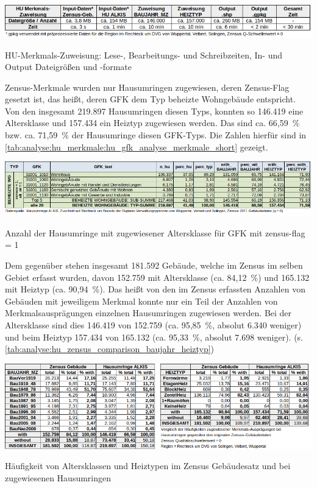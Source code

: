		
		\begin{table}[h]
			\centering
			\includegraphics[width=\linewidth]{Medien/tables/read_write_stats/HU_ALKIS_merkmale_read_write_stats_short.png}
			\caption{HU-Merkmals-Zuweisung: Lese-, Bearbeitungs- und Schreibzeiten, In- und Output Dateigrößen und -formate}
			\label{tab:analyse:hu_merkmale:hu_merkmale_read_write_stats}
		\end{table}
		
		Zensus-Merkmale wurden nur Hausumringen zugewiesen, deren Zensus-Flag gesetzt ist, das heißt, deren GFK dem Typ beheizte Wohngebäude entspricht. Von den insgesamt 219.897 Hausumringen diesen Typs, konnten so 146.419 eine Altersklasse und 157.434 ein Heiztyp zugewiesen werden. Das sind ca. 66,59~\% bzw. ca. 71,59~\% der Hausumringe diesen GFK-Typs. Die Zahlen hierfür sind in \autoref{tab:analyse:hu_merkmale:hu_gfk_analyse_merkmale_short} gezeigt. 
		
		\begin{table}[h]
			\centering
			\includegraphics[width=\linewidth]{Medien/tables/hu_gfk_analyse_merkmale_short.png}
			\caption{Anzahl der Hausumringe mit zugewiesener Altersklasse für GFK mit zensus-flag = 1}
			\label{tab:analyse:hu_merkmale:hu_gfk_analyse_merkmale_short}
		\end{table}
		
		Dem gegenüber stehen insgesamt 181.592 Gebäude, welche im Zensus im selben Gebiet erfasst wurden, davon 152.759 mit Altersklasse (ca. 84,12~\%) und 165.132 mit Heiztyp (ca. 90,94~\%). Das heißt von den im Zensus erfassten Anzahlen von Gebäuden mit jeweiligem Merkmal konnte nur ein Teil der Anzahlen von Merkmalsausprägungen einzelnen Hausumringen zugewiesen werden. Bei der Altersklasse sind dies 146.419 von 152.759 (ca. 95,85~\%, absolut 6.340 weniger) und beim Heiztyp 157.434 von 165.132 (ca. 95,33~\%, absolut 7.698 weniger). (s. \autoref{tab:analyse:hu_zensus_comparison_baujahr_heiztyp})

		\begin{table}
			\includegraphics[width=1\linewidth]{./Medien/tables/hu_zensus_comparison_baujahr_heiztyp_q0.png}
			\caption{Häufigkeit von Altersklassen und Heiztypen im Zensus Gebäudesatz und bei zugewiesenen Hausumringen}
			\label{tab:analyse:hu_zensus_comparison_baujahr_heiztyp}
		\end{table}

